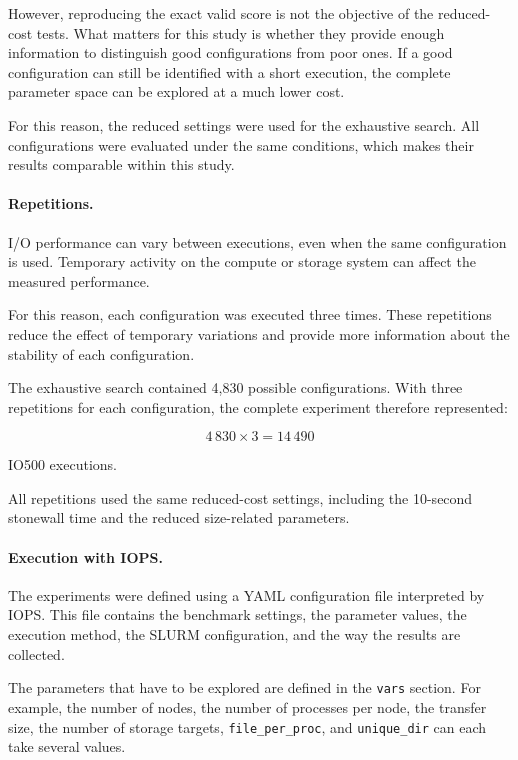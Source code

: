 However, reproducing the exact valid score is not the objective of the
reduced-cost tests. What matters for this study is whether they provide
enough information to distinguish good configurations from poor ones.
If a good configuration can still be identified with a short execution,
the complete parameter space can be explored at a much lower cost.

For this reason, the reduced settings were used for the exhaustive
search. All configurations were evaluated under the same conditions,
which makes their results comparable within this study.

\paragraph{Repetitions.}

I/O performance can vary between executions, even when the same
configuration is used. Temporary activity on the compute or storage
system can affect the measured performance.

For this reason, each configuration was executed three times. These
repetitions reduce the effect of temporary variations and provide more
information about the stability of each configuration.

The exhaustive search contained 4,830 possible configurations. With
three repetitions for each configuration, the complete experiment
therefore represented:

\[
4\,830 \times 3 = 14\,490
\]

IO500 executions.

All repetitions used the same reduced-cost settings, including the
10-second stonewall time and the reduced size-related parameters.

\paragraph{Execution with IOPS.}

The experiments were defined using a YAML configuration file interpreted
by IOPS. This file contains the benchmark settings, the parameter values,
the execution method, the SLURM configuration, and the way the results
are collected.

The parameters that have to be explored are defined in the
\texttt{vars} section. For example, the number of nodes, the number of
processes per node, the transfer size, the number of storage targets,
\texttt{file\_per\_proc}, and \texttt{unique\_dir} can each take several
values.

